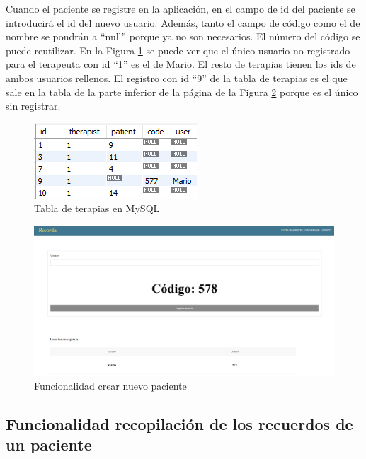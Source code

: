 Cuando el paciente se registre en la aplicación, en el campo de id del paciente se introducirá el id del nuevo usuario. Además, tanto el campo de código como el de nombre se pondrán a ``null'' porque ya no son necesarios. El número del código se puede reutilizar. En la Figura \ref{fig:funcionalidadnuevopacientetablaterapias} se puede ver que el único usuario no registrado para el terapeuta con id ``1'' es el de Mario. El resto de terapias tienen los ids de ambos usuarios rellenos. El registro con id ``9'' de la tabla de terapias es el que sale en la tabla de la parte inferior de la página de la Figura \ref{fig:funcionalidadnuevopaciente} porque es el único sin registrar.  
 
 \begin{figure}[h]
 	\centering
 	\includegraphics[scale=1.6]{Imagenes/Vectorial/funcionalidad_nuevo_paciente_tabla_terapias}
 	\caption{Tabla de terapias en MySQL}
 	\label{fig:funcionalidadnuevopacientetablaterapias}
 \end{figure}

\begin{figure}[h]
	\centering
	\includegraphics[scale=0.3]{Imagenes/Vectorial/funcionalidad_nuevo_paciente}
	\caption{Funcionalidad crear nuevo paciente}
	\label{fig:funcionalidadnuevopaciente}
\end{figure}


\subsection{Funcionalidad recopilación de los recuerdos de un paciente}

